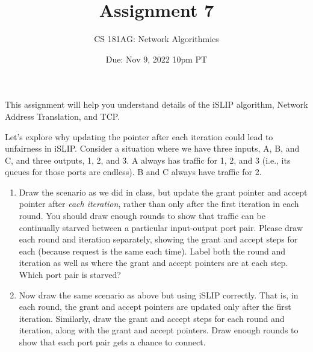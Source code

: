 \documentclass[10pt]{article}
\date{Due: Nov 9, 2022 10pm PT}
\newenvironment{problem}[2][Problem]{\begin{trivlist}
\item[\hskip \labelsep {\bfseries #1}\hskip \labelsep {\bfseries #2.}]}{\end{trivlist}}
\begin{document}
 
\title{Assignment 7}
\author{
CS 181AG: Network Algorithmics}
\maketitle

This assignment will help you understand details of the iSLIP algorithm, Network Address Translation, and TCP. 

\begin{problem}{1: Motivating the iSLIP pointer increment rule}
Let's explore why updating the pointer after each iteration could lead to unfairness in iSLIP. Consider a situation where we have three inputs, A, B, and C, and three outputs, 1, 2, and 3. A always has traffic for 1, 2, and 3 (i.e., its queues for those ports are endless). B and C always have traffic for 2. 

\begin{enumerate}
    \item Draw the scenario as we did in class, but update the grant pointer and accept pointer after \emph{each iteration}, rather than only after the first iteration in each round. You should draw enough rounds to show that traffic can be continually starved between a particular input-output port pair. Please draw each round and iteration separately, showing the grant and accept steps for each (because request is the same each time). Label both the round and iteration as well as where the grant and accept pointers are at each step. Which port pair is starved?
    
    \item Now draw the same scenario as above but using iSLIP correctly. That is, in each round, the grant and accept pointers are updated only after the first iteration. Similarly, draw the grant and accept steps for each round and iteration, along with the grant and accept pointers. Draw enough rounds to show that each port pair gets a chance to connect. 
\end{enumerate}
\end{problem}
\end{document}
